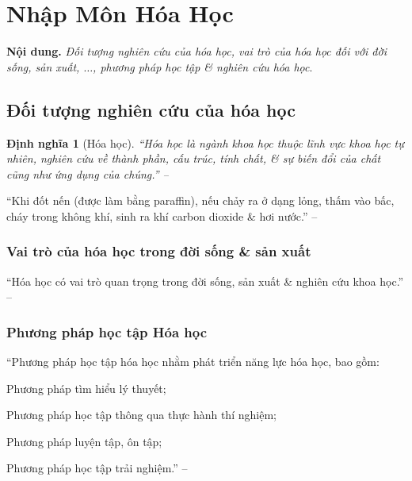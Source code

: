 \documentclass[oneside]{book}
\numberwithin{equation}{section}
\newtheorem{dinhnghia}{Định nghĩa}[section]
\begin{document}
\section{Nhập Môn Hóa Học}
\textbf{Nội dung.} \textit{Đối tượng nghiên cứu của hóa học, vai trò của hóa học đối với đời sống, sản xuất, $\ldots$, phương pháp học tập \& nghiên cứu hóa học}.

\subsection{Đối tượng nghiên cứu của hóa học}

\begin{dinhnghia}[Hóa học]
	``\emph{Hóa học} là ngành khoa học thuộc lĩnh vực khoa học tự nhiên, nghiên cứu về thành phần, cấu trúc, tính chất, \& sự biến đổi của chất cũng như ứng dụng của chúng.'' -- \cite[p. 7]{SGK_Hoa_Hoc_10_Chan_Troi_Sang_Tao}
\end{dinhnghia}
``Khi đốt nến (được làm bằng paraffin), nếu chảy ra ở dạng lỏng, thấm vào bấc, cháy trong không khí, sinh ra khí carbon dioxide \& hơi nước.'' -- \cite[p. 7]{SGK_Hoa_Hoc_10_Chan_Troi_Sang_Tao}

\subsubsection{Vai trò của hóa học trong đời sống \& sản xuất}
``Hóa học có vai trò quan trọng trong đời sống, sản xuất \& nghiên cứu khoa học.'' -- \cite[p. 8]{SGK_Hoa_Hoc_10_Chan_Troi_Sang_Tao}

\subsubsection{Phương pháp học tập Hóa học}
``Phương pháp học tập hóa học nhằm phát triển năng lực hóa học, bao gồm:
\begin{enumerate*}
	\item[\textbf{1.}] Phương pháp tìm hiểu lý thuyết;
	\item[\textbf{2.}] Phương pháp học tập thông qua thực hành thí nghiệm;
	\item[\textbf{3.}] Phương pháp luyện tập, ôn tập;
	\item[\textbf{4.}] Phương pháp học tập trải nghiệm.'' -- \cite[p. 9]{SGK_Hoa_Hoc_10_Chan_Troi_Sang_Tao}
\end{enumerate*}
\end{document}
